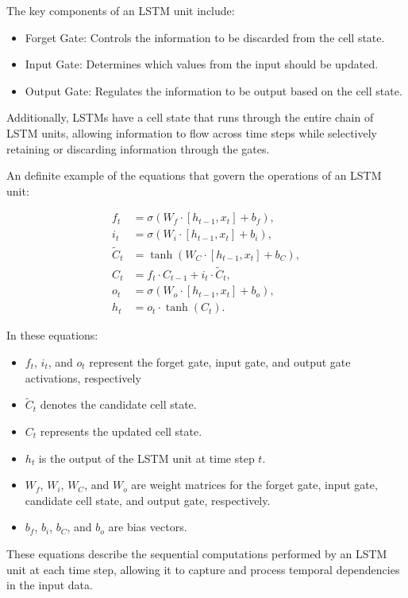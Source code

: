 The key components of an LSTM unit include:

\begin{itemize}
    \item Forget Gate: Controls the information to be discarded from the cell state.
    \item Input Gate: Determines which values from the input should be updated.
    \item Output Gate: Regulates the information to be output based on the cell state.
\end{itemize}

Additionally, LSTMs have a cell state that runs through the entire chain of LSTM units, allowing information to flow across time steps while selectively retaining or discarding information through the gates.

An definite example of the equations that govern the operations of an LSTM unit:

\begin{equation}
\begin{aligned}
f_t & = \sigma(W_f \cdot [h_{t-1}, x_t] + b_f), \\
i_t & = \sigma(W_i \cdot [h_{t-1}, x_t] + b_i), \\
\tilde{C}_t & = \tanh(W_C \cdot [h_{t-1}, x_t] + b_C), \\
C_t & = f_t \cdot C_{t-1} + i_t \cdot \tilde{C}_t, \\
o_t & = \sigma(W_o \cdot [h_{t-1}, x_t] + b_o), \\
h_t & = o_t \cdot \tanh(C_t).
\end{aligned}
\end{equation}

In these equations:

\begin{itemize}
\item $f_t$, $i_t$, and $o_t$ represent the forget gate, input gate, and output gate activations, respectively
\item $\tilde{C}_t$ denotes the candidate cell state.
\item $C_t$ represents the updated cell state.
\item $h_t$ is the output of the LSTM unit at time step $t$.
\item $W_f$, $W_i$, $W_C$, and $W_o$ are weight matrices for the forget gate, input gate, candidate cell state, and output gate, respectively.
\item $b_f$, $b_i$, $b_C$, and $b_o$ are bias vectors.

\end{itemize}

These equations describe the sequential computations performed by an LSTM unit at each time step, allowing it to capture and process temporal dependencies in the input data.

